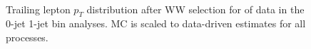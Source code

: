 \begin{figure}[!hbtp]
\centering
{}
\\
\caption{Trailing lepton $p_T$ distribution after WW selection for \intlumiEightTeV of data 
in the 0-jet  1-jet  bin analyses. 
MC is scaled to data-driven estimates for all processes.}
\label{fig:ww_ptmin}
\end{figure}

